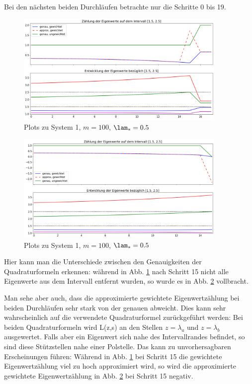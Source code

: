 \documentclass[a4paper,12pt]{report}
\newcommand{\1}{\mathds{1}}
\theoremstyle{plain} %
\theoremstyle{definition} %
\theoremstyle{remark}
\begin{document}
            Bei den nächsten beiden Durchläufen betrachte nur die Schritte 0 bis 19. 

            \begin{figure}[ht]
                  \centering
                  \includegraphics[width=0.9\textwidth, keepaspectratio]{./Original/Plot_1_100_0.5.png}
                  \caption{Plots zu System 1, $m=100$, $\lam_*=0.5$}
                  \label{fig: Plot_1_100_0.5}
            \end{figure}

            \begin{figure}[ht]
                  \centering
                  \includegraphics[width=0.9\textwidth, keepaspectratio]{./Original/Plot_1_150_0.5.png}
                  \caption{Plots zu System 1, $m=100$, $\lam_*=0.5$}
                  \label{fig: Plot_1_150_0.5}
            \end{figure}

            Hier kann man die Unterschiede zwischen den Genauigkeiten der Quadraturformeln erkennen: während in Abb. \ref{fig: Plot_1_100_0.5} nach Schritt 15 nicht alle Eigenwerte aus dem Intervall entfernt wurden,
            so wurde es in Abb. \ref{fig: Plot_1_150_0.5} vollbracht.

            Man sehe aber auch, dass die approximierte gewichtete Eigenwertzählung bei beiden Durchläufen sehr stark von der genauen abweicht.
            Dies kann sehr wahrscheinlich auf die verwendete Quadraturformel zurückgeführt werden:
            Bei beiden Quadraturformeln wird L(z,s) an den Stellen $z=\lambda_a$ und $z=\lambda_b$ ausgewertet.
            Falls aber ein Eigenwert sich nahe des Intervallrandes befindet, so sind diese Stützstellen nahe einer Polstelle.
            Das kann zu unvorhersagbaren Erscheinungen führen:
            Während in Abb. \ref{fig: Plot_1_100_0.5} bei Schritt 15 die gewichtete Eigenwertzählung viel zu hoch approximiert wird,
            so wird die approximierte gewichtete Eigenwertzählung in Abb. \ref{fig: Plot_1_150_0.5} bei Schritt 15 negativ.
\end{document}
